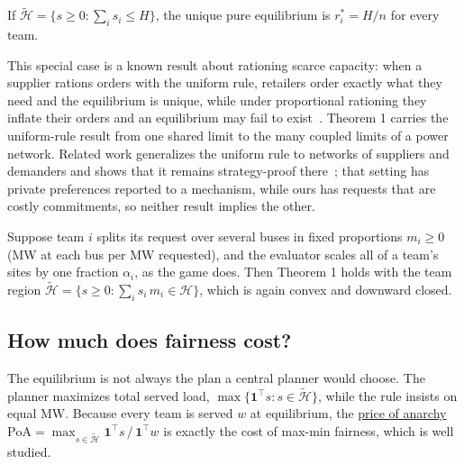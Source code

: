\documentclass[10pt]{article}
\newcommand{\alert}[1]{{\color{alertblue}\uline{#1}}}
\begin{document}
\begin{keybox}
If $\widetilde{\mathcal H} = \{ s \ge 0 : \sum_i s_i \le H \}$, the unique
pure equilibrium is $r_i^* = H/n$ for every team.
\end{keybox}
This special case is a known result about rationing scarce capacity: when a
supplier rations orders with the uniform rule, retailers order exactly what
they need and the equilibrium is unique, while under proportional rationing
they inflate their orders and an equilibrium may fail to
exist~\cite{cachon1999equilibrium}. Theorem 1 carries the uniform-rule result
from one shared limit to the many coupled limits of a power network. Related
work generalizes the uniform rule to networks of suppliers and demanders and
shows that it remains strategy-proof there~\cite{bochet2012balancing}; that
setting has private preferences reported to a mechanism, while ours has
requests that are costly commitments, so neither result implies the other.

\begin{keybox}
Suppose team $i$ splits its request over several buses in fixed proportions
$m_i \ge 0$ (MW at each bus per MW requested), and the evaluator scales all of
a team's sites by one fraction $\alpha_i$, as the game does. Then Theorem 1
holds with the team region
$\widetilde{\mathcal H} = \{ s \ge 0 : \sum_i s_i\, m_i \in \mathcal H\}$, which is
again convex and downward closed.
\end{keybox}

\subsection{How much does fairness cost?}

The equilibrium is not always the plan a central planner would choose. The
planner maximizes total served load,
$\max\{\mathbf 1^{\top} s : s \in \widetilde{\mathcal H}\}$, while the rule
insists on equal MW. Because every team is served $w$ at equilibrium, the
\alert{price of anarchy}
$\mathrm{PoA} = \max_{s \in \widetilde{\mathcal H}} \mathbf 1^{\top} s \,/\, \mathbf 1^{\top} w$
is exactly the cost of max-min fairness, which is well studied.
\end{document}

